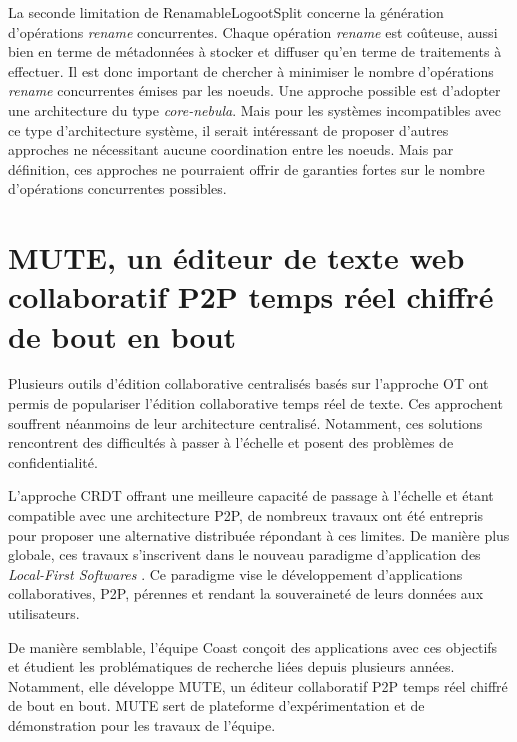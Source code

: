 \documentclass[12pt]{thesul}
\begin{document}
La seconde limitation de RenamableLogootSplit concerne la génération d'opérations \emph{rename} concurrentes.
Chaque opération \emph{rename} est coûteuse, aussi bien en terme de métadonnées à stocker et diffuser qu'en terme de traitements à effectuer.
Il est donc important de chercher à minimiser le nombre d'opérations \emph{rename} concurrentes émises par les noeuds.
Une approche possible est d'adopter une architecture du type \emph{core-nebula}\cite{zawirski:hal-01248197}.
Mais pour les systèmes incompatibles avec ce type d'architecture système, il serait intéressant de proposer d'autres approches ne nécessitant aucune coordination entre les noeuds.
Mais par définition, ces approches ne pourraient offrir de garanties fortes sur le nombre d'opérations concurrentes possibles.

% 

\NumberThisInToc
\chapter{MUTE, un éditeur de texte web collaboratif P2P temps réel chiffré de bout en bout}
\minitoc


Plusieurs outils d'édition collaborative centralisés basés sur l'approche OT ont permis de populariser l'édition collaborative temps réel de texte\cite{gdocs, etherpad}.
Ces approchent souffrent néanmoins de leur architecture centralisé.
Notamment, ces solutions rencontrent des difficultés à passer à l'échelle\cite{2015-cope-delay-collaborative-note-taking-ignat, 2016-performance-collaborative-editors-dang-ignat} et posent des problèmes de confidentialité\cite{prism-washington-post, prism-guardian}.

L'approche \ac{CRDT} offrant une meilleure capacité de passage à l'échelle et étant compatible avec une architecture \ac{P2P}, de nombreux travaux\cite{peerpad, serenity-notes} ont été entrepris pour proposer une alternative distribuée répondant à ces limites.
De manière plus globale, ces travaux s'inscrivent dans le nouveau paradigme d'application des \emph{Local-First Softwares} \cite{localfirstsoftware2019, pushpin2020}.
Ce paradigme vise le développement d'applications collaboratives, \ac{P2P}, pérennes et rendant la souveraineté de leurs données aux utilisateurs.

De manière semblable, l'équipe Coast conçoit des applications avec ces objectifs et étudient les problématiques de recherche liées depuis plusieurs années.
Notamment, elle développe \acf{MUTE}, un éditeur collaboratif \ac{P2P} temps réel chiffré de bout en bout.
\ac{MUTE} sert de plateforme d'expérimentation et de démonstration pour les travaux de l'équipe.
\end{document}
